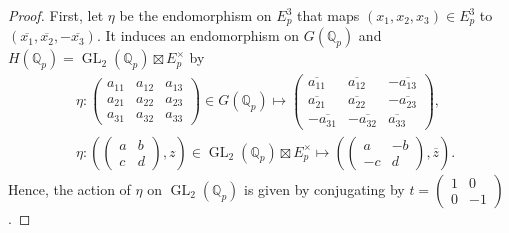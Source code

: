 \documentclass[11pt, a4paper]{amsart}
\theoremstyle{plain}
\theoremstyle{definition}
\numberwithin{equation}{section}
\def\QQ{\mathbb{Q}}
\DeclareMathOperator{\GL}{\mathrm{GL}}
\newcommand{\Qp}{\QQ_p}
\begin{document}
\begin{proof}
    First, let $\eta$ be the endomorphism on $E_{p}^{3}$ that maps $(x_1, x_2, x_3) \in E_p^{3}$ to $(\overline{x_1}, \overline{x_2}, -\overline{x_3})$.
    It induces an endomorphism on $G(\Qp)$ and $H(\Qp) = \GL_2(\Qp) \boxtimes E_{p}^{\times}$ by 
    \begin{align*}
        & \eta \colon \begin{pmatrix}
                    a_{11} & a_{12} & a_{13} \\
                    a_{21} & a_{22} & a_{23} \\
                    a_{31} & a_{32} & a_{33} 
                \end{pmatrix} \in G(\Qp) \mapsto \begin{pmatrix}
                                                    \overline{a_{11}} & \overline{a_{12}} & -\overline{a_{13}} \\
                                                        \overline{a_{21}} & \overline{a_{22}} & -\overline{a_{23}} \\
                                                        -\overline{a_{31}} & -\overline{a_{32}} & \overline{a_{33}} 
                                                   \end{pmatrix}, \\
        & \eta \colon (\begin{pmatrix}
                    a & b \\
                    c & d
                \end{pmatrix}, z) \in \GL_2(\Qp) \boxtimes E_{p}^{\times} \mapsto (\begin{pmatrix}
                                                                                        a & -b \\
                                                                                        -c & d
                                                                                    \end{pmatrix}, \overline{z}).
    \end{align*}
    Hence, the action of $\eta$ on $\GL_{2}(\Qp)$ is given by conjugating by $t = \begin{pmatrix}
                                                                                        1 & 0 \\
                                                                                        0 & -1
                                                                                    \end{pmatrix}$. 

\end{proof}
\end{document}
